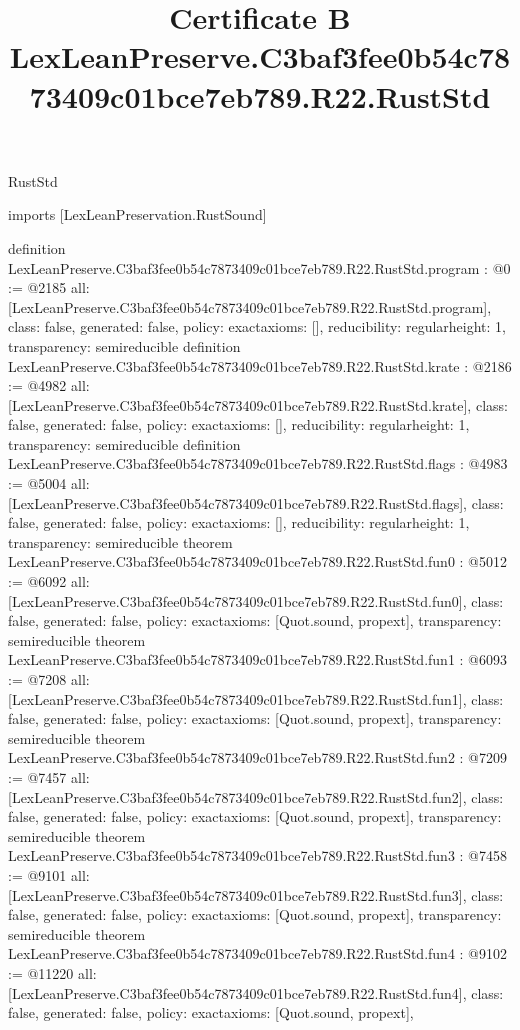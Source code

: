 \begin{lexlean}{RustStd}
\title{Certificate B LexLeanPreserve.C3baf3fee0b54c7873409c01bce7eb789.R22.RustStd}
\begin{coremodule}
imports [LexLeanPreservation.RustSound]

definition LexLeanPreserve.C3baf3fee0b54c7873409c01bce7eb789.R22.RustStd.program : @0 := @2185 {
  all: [LexLeanPreserve.C3baf3fee0b54c7873409c01bce7eb789.R22.RustStd.program],
  class: false,
  generated: false,
  policy: exact{axioms: []},
  reducibility: regular{height: 1},
  transparency: semireducible
}
definition LexLeanPreserve.C3baf3fee0b54c7873409c01bce7eb789.R22.RustStd.krate : @2186 := @4982 {
  all: [LexLeanPreserve.C3baf3fee0b54c7873409c01bce7eb789.R22.RustStd.krate],
  class: false,
  generated: false,
  policy: exact{axioms: []},
  reducibility: regular{height: 1},
  transparency: semireducible
}
definition LexLeanPreserve.C3baf3fee0b54c7873409c01bce7eb789.R22.RustStd.flags : @4983 := @5004 {
  all: [LexLeanPreserve.C3baf3fee0b54c7873409c01bce7eb789.R22.RustStd.flags],
  class: false,
  generated: false,
  policy: exact{axioms: []},
  reducibility: regular{height: 1},
  transparency: semireducible
}
theorem LexLeanPreserve.C3baf3fee0b54c7873409c01bce7eb789.R22.RustStd.fun0 : @5012 := @6092 {
  all: [LexLeanPreserve.C3baf3fee0b54c7873409c01bce7eb789.R22.RustStd.fun0],
  class: false,
  generated: false,
  policy: exact{axioms: [Quot.sound, propext]},
  transparency: semireducible
}
theorem LexLeanPreserve.C3baf3fee0b54c7873409c01bce7eb789.R22.RustStd.fun1 : @6093 := @7208 {
  all: [LexLeanPreserve.C3baf3fee0b54c7873409c01bce7eb789.R22.RustStd.fun1],
  class: false,
  generated: false,
  policy: exact{axioms: [Quot.sound, propext]},
  transparency: semireducible
}
theorem LexLeanPreserve.C3baf3fee0b54c7873409c01bce7eb789.R22.RustStd.fun2 : @7209 := @7457 {
  all: [LexLeanPreserve.C3baf3fee0b54c7873409c01bce7eb789.R22.RustStd.fun2],
  class: false,
  generated: false,
  policy: exact{axioms: [Quot.sound, propext]},
  transparency: semireducible
}
theorem LexLeanPreserve.C3baf3fee0b54c7873409c01bce7eb789.R22.RustStd.fun3 : @7458 := @9101 {
  all: [LexLeanPreserve.C3baf3fee0b54c7873409c01bce7eb789.R22.RustStd.fun3],
  class: false,
  generated: false,
  policy: exact{axioms: [Quot.sound, propext]},
  transparency: semireducible
}
theorem LexLeanPreserve.C3baf3fee0b54c7873409c01bce7eb789.R22.RustStd.fun4 : @9102 := @11220 {
  all: [LexLeanPreserve.C3baf3fee0b54c7873409c01bce7eb789.R22.RustStd.fun4],
  class: false,
  generated: false,
  policy: exact{axioms: [Quot.sound, propext]},
}
\end{coremodule}
\end{lexlean}
